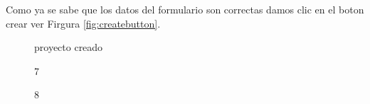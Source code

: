 Como ya se sabe que los datos del formulario son correctas damos clic en el boton crear ver Firgura \ref{fig:createbutton}.
\begin{figure}[H]
\caption{proyecto creado} \label{fig:viewprojectcreated}
\centering
{}
\end{figure}

\begin{figure}[H]
\caption{7}
\centering
{}
\end{figure}

\begin{figure}[H]
\caption{8}
\centering
{}
\end{figure}

